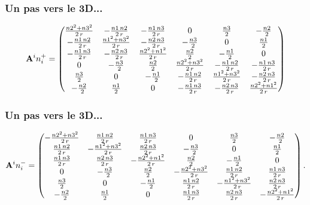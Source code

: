 \documentclass[9pt]{beamer}
\begin{document}
\begin{frame}
\frametitle{Un pas vers le 3D...}

\begin{equation}
\mathbf{A}^in_i^+=
\begin{pmatrix}
\frac{{n2}^{2}+{n3}^{2}}{2\,r} & -\frac{n1\,n2}{2\,r} & -\frac{n1\,n3}{2\,r} & 0 & \frac{n3}{2} & -\frac{n2}{2}\cr
 -\frac{n1\,n2}{2\,r} & \frac{{n1}^{2}+{n3}^{2}}{2\,r} & -\frac{n2\,n3}{2\,r} & -\frac{n3}{2} & 0 & \frac{n1}{2}\cr
 -\frac{n1\,n3}{2\,r} & -\frac{n2\,n3}{2\,r} & \frac{{n2}^{2}+{n1}^{2}}{2\,r} & \frac{n2}{2} & -\frac{n1}{2} & 0\cr
 0 & -\frac{n3}{2} & \frac{n2}{2} & \frac{{n2}^{2}+{n3}^{2}}{2\,r} & -\frac{n1\,n2}{2\,r} & -\frac{n1\,n3}{2\,r}\cr
 \frac{n3}{2} & 0 & -\frac{n1}{2} & -\frac{n1\,n2}{2\,r} & \frac{{n1}^{2}+{n3}^{2}}{2\,r} & -\frac{n2\,n3}{2\,r}\cr
 -\frac{n2}{2} & \frac{n1}{2} & 0 & -\frac{n1\,n3}{2\,r} & -\frac{n2\,n3}{2\,r} & \frac{{n2}^{2}+{n1}^{2}}{2\,r}
 \end{pmatrix}
  \end{equation}
\end{frame}


\begin{frame}
\frametitle{Un pas vers le 3D...}
 \begin{equation}
 \mathbf{A}^in_i^-=
 \begin{pmatrix}
 -\frac{{n2}^{2}+{n3}^{2}}{2\,r} & \frac{n1\,n2}{2\,r} & \frac{n1\,n3}{2\,r} & 0 & \frac{n3}{2} & -\frac{n2}{2}\cr
 \frac{n1\,n2}{2\,r} & -\frac{{n1}^{2}+{n3}^{2}}{2\,r} & \frac{n2\,n3}{2\,r} & -\frac{n3}{2} & 0 & \frac{n1}{2}\cr 
 \frac{n1\,n3}{2\,r} & \frac{n2\,n3}{2\,r} & -\frac{{n2}^{2}+{n1}^{2}}{2\,r} & \frac{n2}{2} & -\frac{n1}{2} & 0\cr
 0 & -\frac{n3}{2} & \frac{n2}{2} & -\frac{{n2}^{2}+{n3}^{2}}{2\,r} & \frac{n1\,n2}{2\,r} & \frac{n1\,n3}{2\,r}\cr
 \frac{n3}{2} & 0 & -\frac{n1}{2} & \frac{n1\,n2}{2\,r} & -\frac{{n1}^{2}+{n3}^{2}}{2\,r} & \frac{n2\,n3}{2\,r}\cr
 -\frac{n2}{2} & \frac{n1}{2} & 0 & \frac{n1\,n3}{2\,r} & \frac{n2\,n3}{2\,r} & -\frac{{n2}^{2}+{n1}^{2}}{2\,r}
 \end{pmatrix}.
 \end{equation}
\end{frame}
\end{document}
